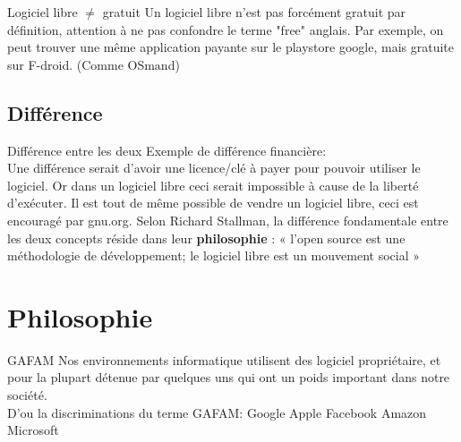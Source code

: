 \documentclass{beamer}
\begin{document}
\begin{frame}{Logiciel libre $ \ne $ gratuit}
	Un logiciel libre n'est pas forcément gratuit par définition, attention à ne pas confondre le terme "free" anglais.
	\newline
	\newline
	Par exemple, on peut trouver une même application payante sur le playstore google, mais gratuite sur F-droid. (Comme OSmand)
\end{frame}

\subsection{Différence}
\begin{frame}{Différence entre les deux}
	Exemple de différence financière: \\
	Une différence serait d'avoir une licence/clé à payer pour pouvoir utiliser le logiciel. Or dans un logiciel libre ceci serait impossible à cause de la liberté d’exécuter.
	\newline
	\newline
	Il est tout de même possible de vendre un logiciel libre, ceci est encouragé par gnu.org. 	\newline
	\newline
	Selon Richard Stallman, la différence fondamentale entre les deux concepts réside dans leur \textbf{philosophie} : « l'open source est une méthodologie de développement; le logiciel libre est un mouvement social »
\end{frame}




\section{Philosophie}
\begin{frame}{GAFAM}
Nos environnements informatique utilisent des logiciel propriétaire, et pour la plupart détenue par quelques uns qui ont un poids important dans notre société. \\
D'ou la discriminations du terme GAFAM: Google Apple Facebook Amazon Microsoft

\end{frame}
\end{document}
